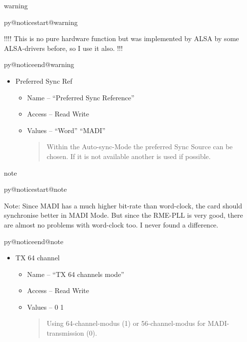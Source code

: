 \documentclass[a4paper,8pt,english]{sphinxmanual}
\makeatletter
\renewenvironment{notice}[2]{%
          \def\py@noticetype{#1}
          \begin{coloredbox}{#1}
          \bf\it
          \par\strong{#2}
          \csname py@noticestart@#1\endcsname
        }
	{
          \csname py@noticeend@\py@noticetype\endcsname
          \end{coloredbox}
        }
\makeatother
\begin{document}
\begin{notice}{warning}{Warning:}
!!!! This is no pure hardware function but was implemented by
ALSA by some ALSA-drivers before, so I use it also. !!!
\end{notice}
\begin{itemize}
\item {} 
Preferred Sync Ref
\begin{itemize}
\item {} 
Name -- ``Preferred Sync Reference''

\item {} 
Access -- Read Write

\item {} 
Values -- ``Word'' ``MADI''
\begin{quote}

Within the Auto-sync-Mode the preferred Sync Source can be
chosen. If it is not available another is used if possible.
\end{quote}

\end{itemize}

\end{itemize}

\begin{notice}{note}{Note:}
Note: Since MADI has a much higher bit-rate than word-clock, the
card should synchronise better in MADI Mode. But since the
RME-PLL is very good, there are almost no problems with
word-clock too. I never found a difference.
\end{notice}
\begin{itemize}
\item {} 
TX 64 channel
\begin{itemize}
\item {} 
Name -- ``TX 64 channels mode''

\item {} 
Access -- Read Write

\item {} 
Values -- 0 1
\begin{quote}

Using 64-channel-modus (1) or 56-channel-modus for
MADI-transmission (0).
\end{quote}

\end{itemize}

\end{itemize}
\end{document}
